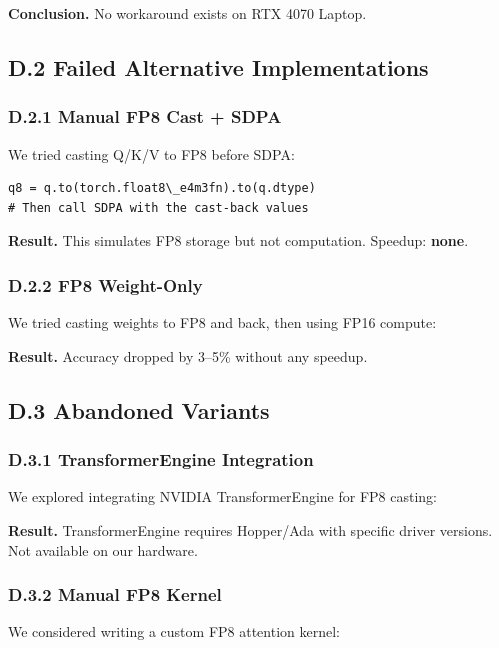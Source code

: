 \textbf{Conclusion.} No workaround exists on RTX 4070 Laptop.

\subsection{D.2 Failed Alternative Implementations}

\subsubsection{D.2.1 Manual FP8 Cast + SDPA}

We tried casting Q/K/V to FP8 before SDPA:

\begin{lstlisting}
q8 = q.to(torch.float8\_e4m3fn).to(q.dtype)
# Then call SDPA with the cast-back values
\end{lstlisting}

\textbf{Result.} This simulates FP8 storage but not computation. Speedup: \textbf{none}.

\subsubsection{D.2.2 FP8 Weight-Only}

We tried casting weights to FP8 and back, then using FP16 compute:

\textbf{Result.} Accuracy dropped by 3--5\% without any speedup.

\subsection{D.3 Abandoned Variants}

\subsubsection{D.3.1 TransformerEngine Integration}

We explored integrating NVIDIA TransformerEngine for FP8 casting:

\textbf{Result.} TransformerEngine requires Hopper/Ada with specific driver 
versions. Not available on our hardware.

\subsubsection{D.3.2 Manual FP8 Kernel}

We considered writing a custom FP8 attention kernel:

